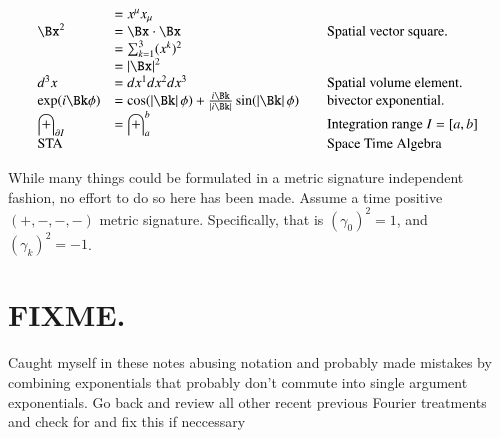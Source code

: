 \documentclass{article}
\begin{document}
\begin{equation*}
\begin{array}{l l l}
    &= x^\mu x_\mu \\
\Bx^2 &= \Bx \cdot \Bx & \quad \mbox{Spatial vector square. } \\
    &= \sum_{k=1}^3 (x^k)^2 \\
    &= \Abs{\Bx}^2 \\
d^3 x &= dx^1 dx^2 dx^3 & \quad \mbox{Spatial volume element. } \\
\exp(i\Bk\phi) &= 
\cos(\Abs{\Bk}\phi) + \frac{i \Bk}{\Abs{i\Bk}} \sin(\Abs{\Bk}\phi) & \quad \mbox{bivector exponential. } \\
\int_{\partial I} &= \int_{a}^{b} & \quad \mbox{Integration range $I = [a,b]$ } \\
\text{STA} & & \quad \mbox{Space Time Algebra} \\
\end{array}
\end{equation*}

While many things could be formulated in a metric signature independent fashion, no effort to do so here has been made.  Assume
a time positive
$(+,-,-,-)$
metric signature.  Specifically, that is $(\gamma_0)^2 = 1$, and $(\gamma_k)^2 = -1$.  


\section{ FIXME. }

Caught myself in these notes abusing notation and probably made mistakes by combining exponentials that probably don't commute into single argument exponentials.  Go back and review all other recent previous Fourier treatments and check for and fix this if neccessary



\end{document}
